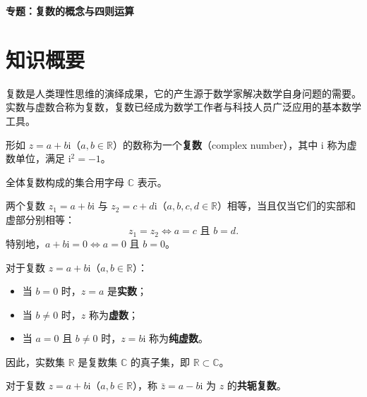 \documentclass[11pt]{ctexrep}
\begin{document}
\begin{center}
    {\LARGE\bfseries 专题：复数的概念与四则运算}
\end{center}

\section*{知识概要}

复数是人类理性思维的演绎成果，它的产生源于数学家解决数学自身问题的需要。实数与虚数合称为复数，复数已经成为数学工作者与科技人员广泛应用的基本数学工具。

\begin{definition}[复数的定义]
    形如 $z = a + b\mathrm{i}$（$a, b \in \mathbb{R}$）的数称为一个\textbf{复数}（complex number），其中 $\mathrm{i}$ 称为虚数单位，满足 $\mathrm{i}^2 = -1$。
    
    全体复数构成的集合用字母 $\mathbb{C}$ 表示。
\end{definition}

\begin{property}[复数的相等条件]
    两个复数 $z_1 = a + b\mathrm{i}$ 与 $z_2 = c + d\mathrm{i}$（$a, b, c, d \in \mathbb{R}$）相等，当且仅当它们的实部和虚部分别相等：
    \[
        z_1 = z_2 \Leftrightarrow a = c \text{ 且 } b = d.
    \]
    特别地，$a + b\mathrm{i} = 0 \Leftrightarrow a = 0$ 且 $b = 0$。
\end{property}

\begin{property}[复数的分类]
    对于复数 $z = a + b\mathrm{i}$（$a, b \in \mathbb{R}$）：
    \begin{itemize}
        \item 当 $b = 0$ 时，$z = a$ 是\textbf{实数}；
        \item 当 $b \neq 0$ 时，$z$ 称为\textbf{虚数}；
        \item 当 $a = 0$ 且 $b \neq 0$ 时，$z = b\mathrm{i}$ 称为\textbf{纯虚数}。
    \end{itemize}
    因此，实数集 $\mathbb{R}$ 是复数集 $\mathbb{C}$ 的真子集，即 $\mathbb{R} \subset \mathbb{C}$。
\end{property}

\begin{definition}[共轭复数]
    对于复数 $z = a + b\mathrm{i}$（$a, b \in \mathbb{R}$），称 $\bar{z} = a - b\mathrm{i}$ 为 $z$ 的\textbf{共轭复数}。
\end{definition}
\end{document}
